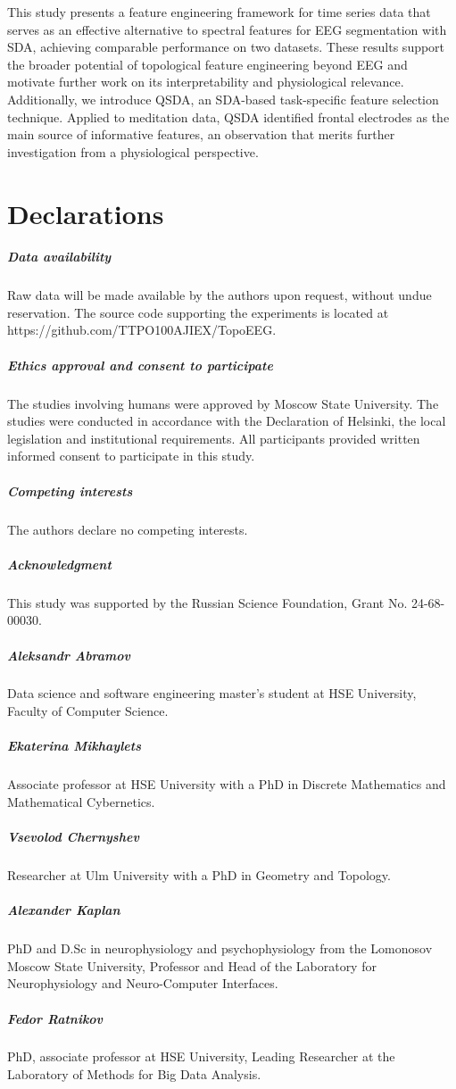 \documentclass[pdflatex,sn-basic,Numbered]{sn-jnl}
\begin{document}
This study presents a feature engineering framework for time series data that serves as an effective alternative to spectral features for EEG segmentation with SDA, achieving comparable performance on two datasets. These results support the broader potential of topological feature engineering beyond EEG and motivate further work on its interpretability and physiological relevance. Additionally, we introduce QSDA, an SDA-based task-specific feature selection technique. Applied to meditation data, QSDA identified frontal electrodes as the main source of informative features, an observation that merits further investigation from a physiological perspective.

\section*{Declarations}

\subparagraph{\textbf{Data availability}}
Raw data will be made available by the authors upon request, without undue reservation. The source code supporting the experiments is located at https://github.com/TTPO100AJIEX/TopoEEG.

\subparagraph{\textbf{Ethics approval and consent to participate}}
The studies involving humans were approved by Moscow State University. The studies were conducted in accordance with the Declaration of Helsinki, the local legislation and institutional requirements. All participants provided written informed consent to participate in this study.

\subparagraph{\textbf{Competing interests}}
The authors declare no competing interests.

\subparagraph{\textbf{Acknowledgment}}
This study was supported by the Russian Science Foundation, Grant No. 24-68-00030.



\subparagraph{\textbf{Aleksandr Abramov}} Data science and software engineering master's student at HSE University, Faculty of Computer Science.
\subparagraph{\textbf{Ekaterina Mikhaylets}} Associate professor at HSE University with a PhD in Discrete Mathematics and Mathematical Cybernetics.
\subparagraph{\textbf{Vsevolod Chernyshev}} Researcher at Ulm University with a PhD in Geometry and Topology.
\subparagraph{\textbf{Alexander Kaplan}} PhD and D.Sc in neurophysiology and psychophysiology from the Lomonosov Moscow State University, Professor and Head of the Laboratory for Neurophysiology and Neuro-Computer Interfaces.
\subparagraph{\textbf{Fedor Ratnikov}} PhD, associate professor at HSE University, Leading Researcher at the Laboratory of Methods for Big Data Analysis.
\end{document}
